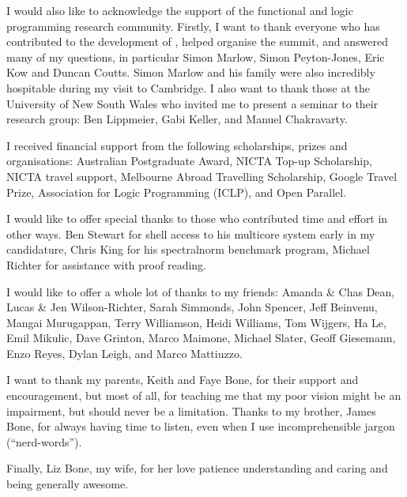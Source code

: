 \documentclass[a4paper,twoside,openright]{report}
\begin{document}
I would also like to acknowledge the support of the functional and logic
programming research community.
Firstly, I want to thank everyone
who has contributed to the development of \tscope,
helped organise the \tscope summit, and
answered many of my questions,
in particular
Simon Marlow,
Simon Peyton-Jones,
Eric Kow
and Duncan Coutts.
Simon Marlow and his family were also incredibly hospitable during my visit
to Cambridge.
I also want to thank those at the University of New South Wales who invited
me to present a seminar to their research group:
Ben Lippmeier,
Gabi Keller,
and Manuel Chakravarty.

I received financial support from the following scholarships, prizes and
organisations:
Australian Postgraduate Award,
NICTA Top-up Scholarship,
NICTA travel support,
Melbourne Abroad Travelling Scholarship,
Google Travel Prize,
Association for Logic Programming (ICLP),
and
Open Parallel.

I would like to offer special thanks to those who contributed time and
effort in other ways.
Ben Stewart for shell access to his multicore system early in my candidature,
Chris King for his spectralnorm benchmark program,
Michael Richter for assistance with proof reading.

I would like to offer a whole lot of thanks to my friends:
Amanda \& Chas Dean,
Lucas \& Jen Wilson-Richter,
Sarah Simmonds, John Spencer,
Jeff Beinvenu, Mangai Murugappan,
Terry Williamson, Heidi Williams,
Tom Wijgers,
Ha Le,
Emil Mikulic,
Dave Grinton,
Marco Maimone,
Michael Slater,
Geoff Giesemann,
Enzo Reyes,
Dylan Leigh,
and Marco Mattiuzzo.

I want to thank my parents, Keith and Faye Bone, for their support and
encouragement,
but most of all,
for teaching me that my poor vision might be an impairment, but should never
be a limitation.
Thanks to my brother, James Bone, for always having time to listen,
even when I use incomprehensible jargon (``nerd-words'').

Finally, Liz Bone, my wife,
for her love patience understanding and caring
and being generally awesome.


\tableofcontents

\listoffigures

\listoftables

\listofalgorithms











\end{document}
